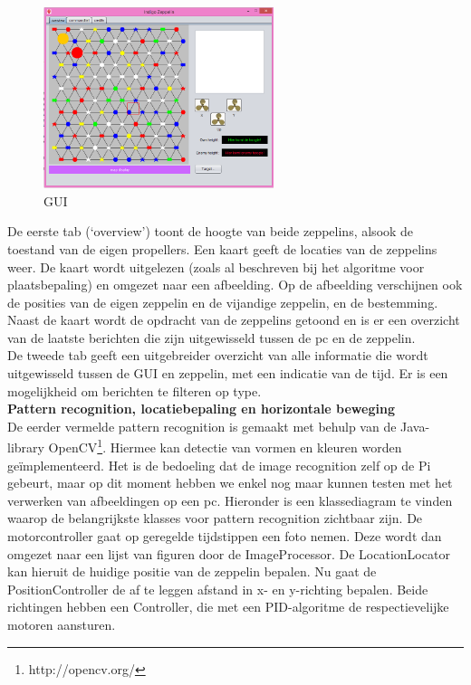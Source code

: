 \documentclass[tt]{penoverslag}
\begin{document}
\begin{figure}[H]
\begin{center}
\includegraphics[width=0.6\textwidth]{GUI.png}
\end{center}
\caption{GUI}
\label{GUI}
\end{figure}

De eerste tab (`overview') toont de hoogte van beide zeppelins, alsook de toestand van de eigen propellers. Een kaart geeft de locaties van de zeppelins weer. De kaart wordt uitgelezen (zoals al beschreven bij het algoritme voor plaatsbepaling) en omgezet naar een afbeelding. Op de afbeelding verschijnen ook de posities van de eigen zeppelin en de vijandige zeppelin, en de bestemming. Naast de kaart wordt de opdracht van de zeppelins getoond en is er een overzicht van de laatste berichten die zijn uitgewisseld tussen de pc en de zeppelin. \\

De tweede tab geeft een uitgebreider overzicht van alle informatie die wordt uitgewisseld tussen de GUI en zeppelin, met een indicatie van de tijd. Er is een mogelijkheid om berichten te filteren op type. \\



\textbf{Pattern recognition, locatiebepaling en horizontale beweging}\\
De eerder vermelde pattern recognition is gemaakt met behulp van de Java-library OpenCV\footnote{http://opencv.org/}. Hiermee kan detectie van vormen en kleuren worden ge\"{i}mplementeerd. Het is de bedoeling dat de image recognition zelf op de Pi gebeurt, maar op dit moment hebben we enkel nog maar kunnen testen met het verwerken van afbeeldingen op een pc. Hieronder is een klassediagram te vinden waarop de belangrijkste klasses voor pattern recognition zichtbaar zijn. De motorcontroller gaat op geregelde tijdstippen een foto nemen. Deze wordt dan omgezet naar een lijst van figuren door de ImageProcessor. De LocationLocator kan hieruit de huidige positie van de zeppelin bepalen. Nu gaat de PositionController de af te leggen afstand in x- en y-richting bepalen. Beide richtingen hebben een Controller, die met een PID-algoritme de respectievelijke motoren aansturen.\\
\end{document}
